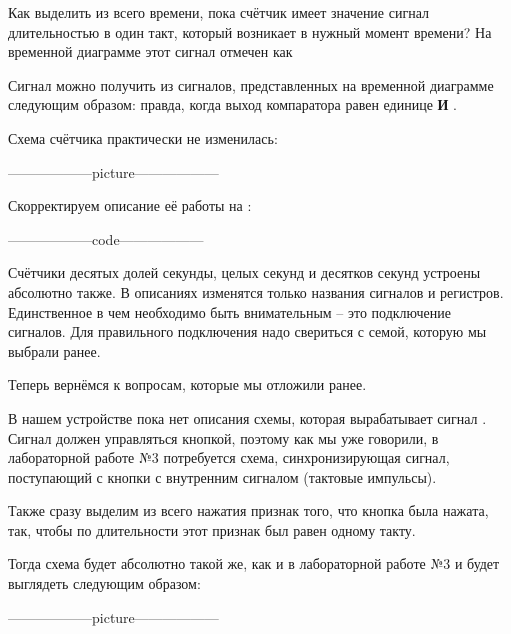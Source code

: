 \par{Как выделить из всего времени, пока счётчик имеет значение  сигнал длительностью в один такт, который возникает в нужный момент времени? На временной диаграмме этот сигнал отмечен как 

\par{Сигнал  можно получить из сигналов, представленных на временной диаграмме следующим образом:  правда, когда выход компаратора равен единице \textbf{И} .}

\par{Схема счётчика практически не изменилась:}

\par{------------------picture------------------}

\par{Скорректируем описание её работы на :}

\par{------------------code------------------}

\par{Счётчики десятых долей секунды, целых секунд и десятков секунд устроены абсолютно также. В описаниях изменятся только названия сигналов и регистров. Единственное в чем необходимо быть внимательным – это подключение сигналов. Для правильного подключения надо свериться с семой, которую мы выбрали ранее.}

\par{Теперь вернёмся к вопросам, которые мы отложили ранее.}

\par{В нашем устройстве пока нет описания схемы, которая вырабатывает сигнал . Сигнал должен управляться кнопкой, поэтому как мы уже говорили, в лабораторной работе №3 потребуется схема, синхронизирующая сигнал, поступающий с кнопки с внутренним сигналом  (тактовые импульсы).}

\par{Также сразу выделим из всего нажатия признак того, что кнопка была нажата, так, чтобы по длительности этот признак был равен одному такту.}

\par{Тогда схема будет абсолютно такой же, как и в лабораторной работе №3 и будет выглядеть следующим образом:}

\par{------------------picture------------------}

}
